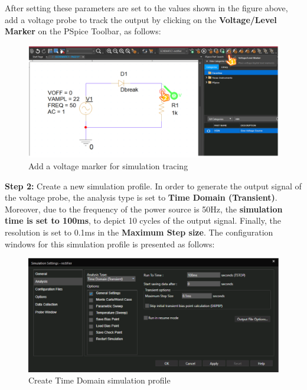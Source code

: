 After setting these parameters are set to the values shown in the figure above, add a voltage probe to track the output by clicking on the \textbf{Voltage/Level Marker} on the PSpice Toolbar, as follows:

\begin{figure}[!htp]
    \label{pic:halfwave_rectifier4}
    \centering
    \includegraphics[width = 5in]{source/picture/bai_2/diode_7.PNG}
    \caption{Add a voltage marker for simulation tracing}
    \label{lab02_ex031f}
\end{figure}

\textbf{Step 2: } Create a new simulation profile.
In order to generate the output signal of the voltage probe, the analysis type is set to \textbf{Time Domain (Transient)}. Moreover, due to the frequency of the power source is 50Hz, the \textbf{simulation time is set to 100ms}, to depict 10 cycles of the output signal. Finally, the resolution is set to 0.1ms in the \textbf{Maximum Step size}. The configuration windows for this simulation profile is presented as follows:

\begin{figure}[!htp]
    \label{pic:halfwave_rectifier5}
    \centering
    \includegraphics[width = 5in]{source/picture/bai_2/diode_8.PNG}
    \caption{Create Time Domain simulation profile}
    \label{lab02_ex031z}
\end{figure}


